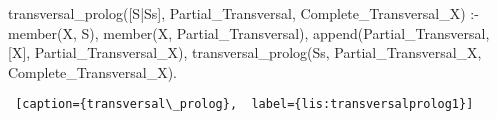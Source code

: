 \begin{center}
\begin{minipage}{\linewidth}
\begin{python}[numbers=left]
transversal_prolog([S|Ss], Partial_Transversal, Complete_Transversal_X) :-
    member(X, S),
    \+ member(X, Partial_Transversal),
    append(Partial_Transversal, [X], Partial_Transversal_X),
    transversal_prolog(Ss, Partial_Transversal_X, Complete_Transversal_X).

\end{python}
\begin{lstlisting} [caption={transversal\_prolog},  label={lis:transversalprolog1}]
\end{lstlisting}
\end{minipage}

\end{center}



